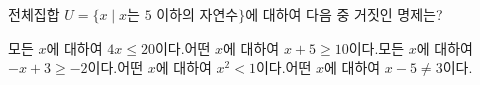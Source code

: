 전체집합 $U=\{x \mid x$는 $5$ 이하의 자연수$\}$에 대하여 다음 중 거짓인 명제는?
\begin{choicesv}{모든 $x$에 대하여 $4x\le 20$이다.}{어떤 $x$에 대하여 $x+5\ge 10$이다.}{모든 $x$에 대하여 $-x+3\ge -2$이다.}{어떤 $x$에 대하여 $x^2<1$이다.}{어떤 $x$에 대하여 $x-5\ne 3$이다.}\end{choicesv}
